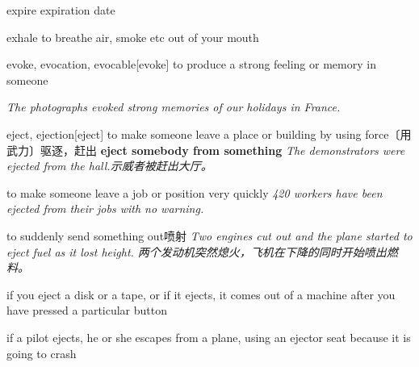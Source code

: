 \begin{DefWord}{expire}
    expiration date
\end{DefWord}

\begin{DefWord}{exhale}
    to breathe air, smoke etc out of your mouth
\end{DefWord}

\begin{DefWord}{evoke, evocation, evocable}[evoke]
    to produce a strong feeling or memory in someone

    \textit{The photographs evoked strong memories of our holidays in France.}

\end{DefWord}

\begin{DefWord}{eject, ejection}[eject]
    to make someone leave a place or building by using force〔用武力〕驱逐，赶出
    \textbf{eject somebody from something}
    \textit{The demonstrators were ejected from the hall.示威者被赶出大厅。 }

    to make someone leave a job or position very quickly
    \textit{420 workers have been ejected from their jobs with no warning.}

    to suddenly send something out喷射
    \textit{Two engines cut out and the plane started to eject fuel as it lost height. 两个发动机突然熄火，飞机在下降的同时开始喷出燃料。 }

    if you eject a disk or a tape, or if it ejects, it comes out of a machine after you have pressed a particular button

    if a pilot ejects, he or she escapes from a plane, using an ejector seat because it is going to crash
\end{DefWord}
